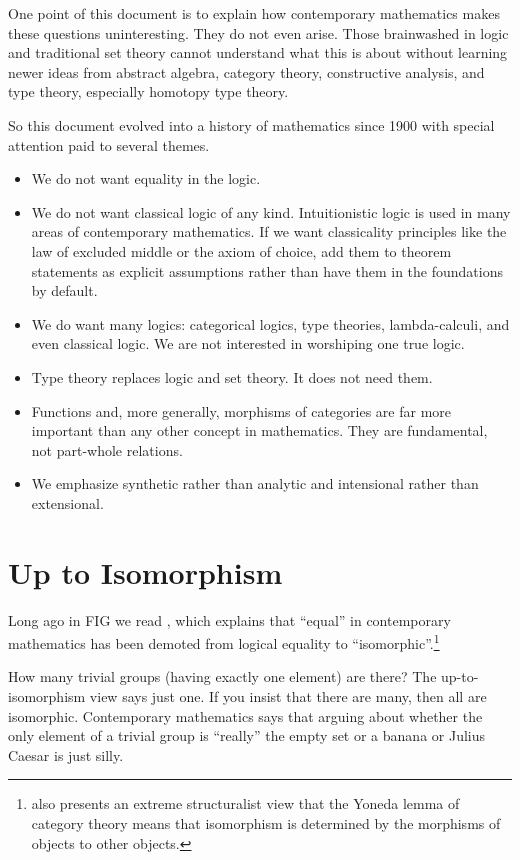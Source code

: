 \documentclass[11pt]{article}
\begin{document}
One point of this document is to explain how contemporary mathematics
makes these
questions uninteresting.  They do not even arise.  Those brainwashed in
logic and traditional
set theory cannot understand what this is about without learning
newer ideas from abstract algebra, category theory, constructive analysis,
and type theory, especially homotopy type theory.

So this document evolved into a history of mathematics since 1900
with special attention paid to several themes.
\begin{itemize}
\item We do not want equality in the logic.
\item We do not want classical logic of any kind.  Intuitionistic logic
    is used in many areas of contemporary mathematics.  If we want
    classicality principles like the law of excluded middle or the axiom
    of choice, add them to theorem statements as explicit assumptions
    rather than have them in the foundations by default.
\item We do want many logics: categorical logics, type theories,
    lambda-calculi, and even classical logic.  We are not interested
    in worshiping one true logic.
\item Type theory replaces logic and set theory.  It does not need them.
\item Functions and, more generally, morphisms of categories are far
    more important than any other concept in mathematics.
    They are fundamental, not part-whole relations.
\item We emphasize synthetic rather than analytic and intensional rather
    than extensional.
\end{itemize}

\section{Up to Isomorphism}
\label{sec:up-to-isomorphism}

Long ago in FIG we read \citet{mazur}, which explains that ``equal''
in contemporary mathematics has been demoted from logical equality
to ``isomorphic''.\footnote{\citeauthor{mazur} also presents an extreme
structuralist view that the Yoneda lemma of category theory means that
isomorphism is determined by the morphisms of objects to other objects.}

How many trivial groups (having exactly one element) are there?
The up-to-isomorphism view says just one.
If you insist that there are many, then all are isomorphic.
Contemporary mathematics says that arguing about whether the only element of a
trivial group is ``really'' the empty set or a banana or Julius Caesar
is just silly.
\end{document}
